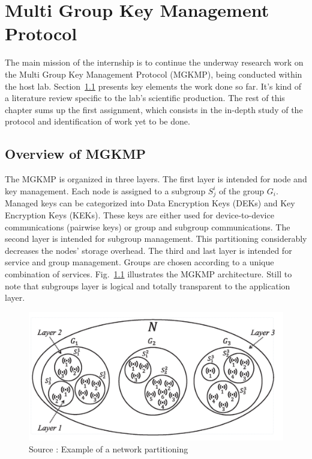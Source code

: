 \chapter{Multi Group Key Management Protocol}
\label{chap:mgkmp}

The main mission of the internship is to continue the underway research work on the Multi Group Key Management Protocol (MGKMP), being conducted within the host lab. Section~\ref{sec:mgkmp_overview} presents key elements the work done so far. It's kind of a literature review specific to the lab's scientific production. The rest of this chapter sums up the first assignment, which consists in the in-depth study of the protocol and identification of work yet to be done.

\section{Overview of MGKMP}
\label{sec:mgkmp_overview}

The MGKMP is organized in three layers. The first layer is intended for node and key management. Each node is assigned to a subgroup $S^i_j$ of the group $G_i$. Managed keys can be categorized into Data Encryption Keys (DEKs) and Key Encryption Keys (KEKs). These keys are either used for device-to-device communications (pairwise keys) or group and subgroup communications. The second layer is intended for subgroup management. This partitioning considerably decreases the nodes' storage overhead. The third and last layer is intended for service and group management. Groups are chosen according to a unique combination of services. Fig.~\ref{fig:mgkmp_layers} illustrates the MGKMP architecture. Still to note that subgroups layer is logical and totally transparent to the application layer.

\begin{figure}[htbp]
	\centerline{\includegraphics[scale=0.60]{figures/mgkmp/mgkmp_layers.png}}
	\caption{Source \cite{kandi_versatile_2020}: Example of a network partitioning}
	\label{fig:mgkmp_layers}
\end{figure}

